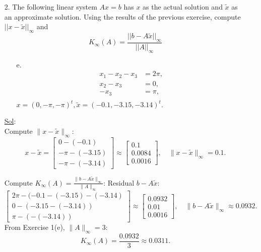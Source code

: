 \begin{enumerate}
  \item[2.] The following linear system \(Ax = b\) has \(x\) as the
    actual solution and \(\tilde{x}\) as an approximate solution.
    Using the results of the previous exercise, compute \(||x -
    \tilde{x}||_{\infty}\) and
    \[
      K_{\infty} (A) = \frac{||b - A \tilde{x}||_{\infty}}{||A||_{\infty}}
    \]

    \begin{enumerate}
      \item[e.] \[
          \begin{aligned}
            x_1 - x_2 - x_3 &= 2 \pi, \\
            x_2 - x_3 &= 0, \\
            -x_3 &= \pi, \\
          \end{aligned}
        \]
        \(x = (0, - \pi, - \pi )^t, \tilde{x} = (-0.1, -3.15, -3.14)^t.\)
    \end{enumerate}

    \underline{Sol}:\\
    Compute \(\|x - \tilde{x}\|_\infty\):
    \[
      x - \tilde{x} =
      \begin{bmatrix} 0 - (-0.1) \\ -\pi - (-3.15) \\ -\pi - (-3.14)
      \end{bmatrix} \approx
      \begin{bmatrix} 0.1 \\ 0.0084 \\ 0.0016
      \end{bmatrix}, \quad \|x - \tilde{x}\|_\infty = \boxed{0.1}.
    \]

    Compute \(K_\infty(A) = \frac{\|b - A\tilde{x}\|_\infty}{\|A\|_\infty}\):
    Residual \(b - A\tilde{x}\):
    \[
      \begin{bmatrix} 2\pi - (-0.1 - (-3.15) - (-3.14) \\ 0 - (-3.15
          - (-3.14)) \\ \pi - (-(-3.14))
        \end{bmatrix} \approx
        \begin{bmatrix} 0.0932 \\ 0.01 \\ 0.0016
        \end{bmatrix}, \quad \|b - A\tilde{x}\|_\infty \approx 0.0932.
      \]
      From Exercise 1(e), \(\|A\|_\infty = 3\):
      \[
        K_\infty(A) = \frac{0.0932}{3} \approx \boxed{0.0311}.
      \]


\end{enumerate}

